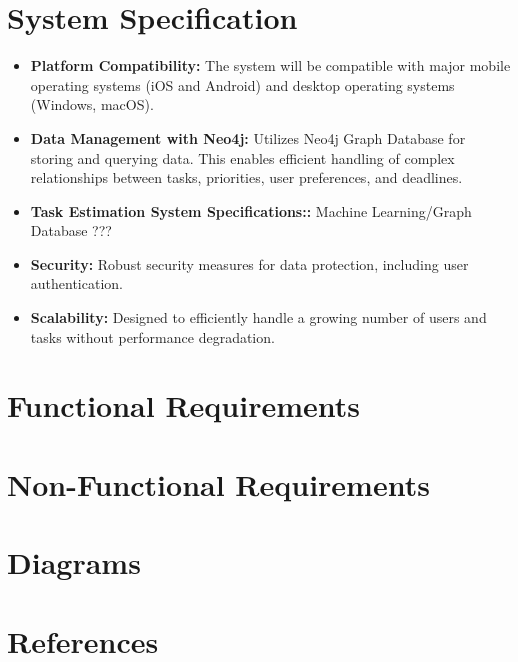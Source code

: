 \documentclass{article}
\begin{document}
\section{System Specification}
\begin{itemize}
\item \textbf{Platform Compatibility:} The system will be compatible with major mobile operating systems (iOS and Android) and desktop operating systems (Windows, macOS).

\item \textbf{Data Management with Neo4j:} Utilizes Neo4j Graph Database for storing and querying data. This enables efficient handling of complex relationships between tasks, priorities, user preferences, and deadlines.

\item \textbf{Task Estimation System Specifications::} Machine Learning/Graph Database ???

\item \textbf{Security:} Robust security measures for data protection, including user authentication.

\item \textbf{Scalability:} Designed to efficiently handle a growing number of users and tasks without performance degradation.

\end{itemize}
\section{Functional Requirements}

\section{Non-Functional Requirements}
\section{Diagrams}
\section{References}
\end{document}
